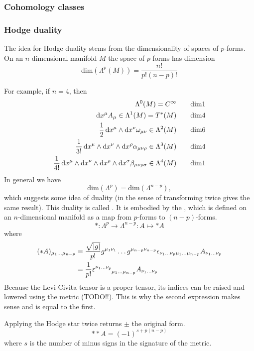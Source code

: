 \subsubsection{Cohomology classes}

\subsubsection{Hodge duality}
The idea for Hodge duality stems from the dimensionality of spaces of $p$-forms. On an $n$-dimensional manifold $M$ the space of $p$-forms has dimension 
\[ \text{dim}(\Lambda^p(M)) = \frac{n!}{p!(n-p)!} \]

For example, if $n=4$, then
\begin{align}
\Lambda^0(M) = C^\infty \qquad &\text{dim} 1 \\
\diff{x^\mu}A_\mu \in \Lambda^1(M) = T^*(M) \qquad &\text{dim} 4 \\
\frac{1}{2}\diff{x^\mu}\wedge \diff{x^\nu}\omega_{\mu\nu} \in \Lambda^2(M) \qquad &\text{dim} 6 \\
\frac{1}{3!}\diff{x^\mu}\wedge \diff{x^\nu}\wedge \diff{x^\rho}\alpha_{\mu\nu\rho} \in \Lambda^3(M) \qquad &\text{dim} 4 \\
\frac{1}{4!}\diff{x^\mu}\wedge \diff{x^\nu}\wedge \diff{x^\rho}\wedge \diff{x^\sigma}\beta_{\mu\nu\rho\sigma} \in \Lambda^4(M) \qquad &\text{dim} 1 \\
\end{align}
In general we have
\[ \text{dim}(\Lambda^p) = \text{dim}(\Lambda^{n-p}), \]
which suggests some idea of duality (in the sense of transforming twice gives the same result). This duality is called . It is embodied by the , which is defined on an $n$-dimensional manifold as a map from $p$-forms to $(n-p)$-forms.
\[ *:\Lambda^p \to \Lambda^{n-p}: A \mapsto *A \]
where
\begin{align}
(*A)_{\mu_1\ldots\mu_{n-p}} &= \frac{\sqrt{|g|}}{p!}g^{\mu_1\nu_1}\ldots g^{\mu_{n-p}\nu_{n-p}}\epsilon_{\nu_1\ldots\nu_p\mu_1\ldots\mu_{n-p}}A_{\nu_1\ldots\nu_p} \\
&= \frac{1}{p!}\tensor{\varepsilon}{^{\nu_1}^{\ldots}^{\nu_p}_{\mu_1\ldots\mu_{n-p}}}A_{\nu_1\ldots\nu_p}
\end{align}
Because the Levi-Civita tensor is a proper tensor, its indices can be raised and lowered using the metric (TODO!!). This is why the second expression makes sense and is equal to the first.

Applying the Hodge star twice returns $\pm$ the original form.
\[ **A = (-1)^{s+p(n-p)} \]
where $s$ is the number of minus signs in the signature of the metric.

